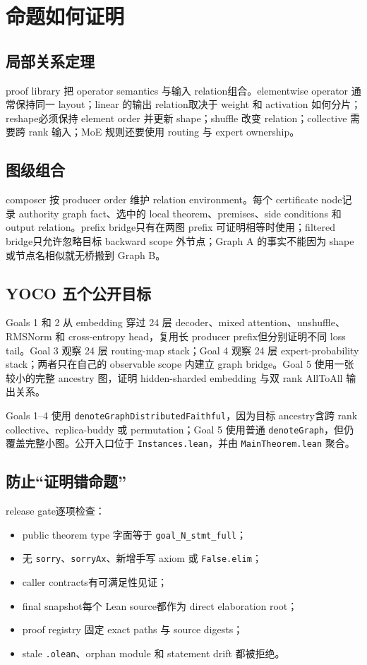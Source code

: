 \documentclass[10.5pt,a4paper]{ctexart}
\newcommand{\code}[1]{\texttt{#1}}
\begin{document}
\section{命题如何证明}

\subsection{局部关系定理}

proof library 把 operator semantics 与输入 relation组合。elementwise operator 通常保持同一 layout；linear 的输出 relation取决于 weight 和 activation 如何分片；reshape必须保持 element order 并更新 shape；shuffle 改变 relation；collective 需要跨 rank 输入；MoE 规则还要使用 routing 与 expert ownership。

\subsection{图级组合}

composer 按 producer order 维护 relation environment。每个 certificate node记录 authority graph fact、选中的 local theorem、premises、side conditions 和 output relation。prefix bridge只有在两图 prefix 可证明相等时使用；filtered bridge只允许忽略目标 backward scope 外节点；Graph A 的事实不能因为 shape 或节点名相似就无桥搬到 Graph B。

\subsection{YOCO 五个公开目标}

Goals 1 和 2 从 embedding 穿过 24 层 decoder、mixed attention、unshuffle、RMSNorm 和 cross-entropy head，复用长 producer prefix但分别证明不同 loss tail。Goal 3 观察 24 层 routing-map stack；Goal 4 观察 24 层 expert-probability stack；两者只在自己的 observable scope 内建立 graph bridge。Goal 5 使用一张较小的完整 ancestry 图，证明 hidden-sharded embedding 与双 rank AllToAll 输出关系。

Goals 1--4 使用 \code{denoteGraphDistributedFaithful}，因为目标 ancestry含跨 rank collective、replica-buddy 或 permutation；Goal 5 使用普通 \code{denoteGraph}，但仍覆盖完整小图。公开入口位于 \code{Instances.lean}，并由 \code{MainTheorem.lean} 聚合。

\subsection{防止“证明错命题”}

release gate逐项检查：
\begin{itemize}
  \item public theorem type 字面等于 \code{goal\_N\_stmt\_full}；
  \item 无 \code{sorry}、\code{sorryAx}、新增手写 axiom 或 \code{False.elim}；
  \item caller contracts有可满足性见证；
  \item final snapshot每个 Lean source都作为 direct elaboration root；
  \item proof registry 固定 exact paths 与 source digests；
  \item stale \code{.olean}、orphan module 和 statement drift 都被拒绝。
\end{itemize}
\end{document}
